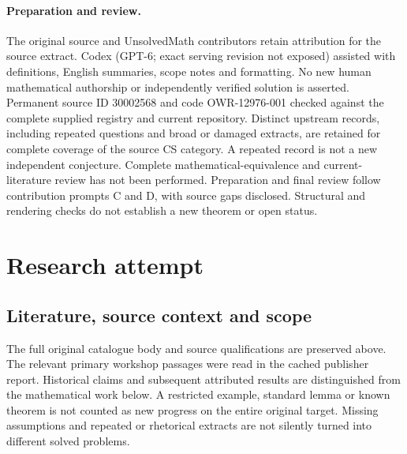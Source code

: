 \documentclass[11pt]{article}
\begin{document}
\paragraph{Preparation and review.}
The original source and UnsolvedMath contributors retain attribution for the source extract. Codex (GPT-6; exact serving revision not exposed) assisted with definitions, English summaries, scope notes and formatting. No new human mathematical authorship or independently verified solution is asserted. Permanent source ID 30002568 and code OWR-12976-001 checked against the complete supplied registry and current repository. Distinct upstream records, including repeated questions and broad or damaged extracts, are retained for complete coverage of the source CS category. A repeated record is not a new independent conjecture. Complete mathematical-equivalence and current-literature review has not been performed. Preparation and final review follow contribution prompts C and D, with source gaps disclosed. Structural and rendering checks do not establish a new theorem or open status.
\label{end:30002568}

\section{Research attempt}
\subsection{Literature, source context and scope}
The full original catalogue body and source qualifications are preserved above. The relevant primary workshop passages were read in the cached publisher report. Historical claims and subsequent attributed results are distinguished from the mathematical work below. A restricted example, standard lemma or known theorem is not counted as new progress on the entire original target. Missing assumptions and repeated or rhetorical extracts are not silently turned into different solved problems.
\end{document}
